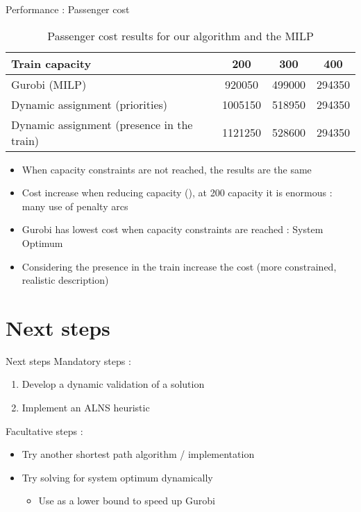 \documentclass{EESD}
\begin{document}
\begin{frame}{Performance : Passenger cost}
	\begin{table}
		\centering
		\begin{tabular}{l|ccc}
			\toprule 
			Train capacity & 200 & 300 & 400 \\
			\midrule
			Gurobi (MILP) & 920050 & 499000 & 294350\\
			Dynamic assignment (priorities) & 1005150 & 518950 & 294350\\
			Dynamic assignment (presence in the train) & 1121250 & 528600 & 294350\\
			\bottomrule
		\end{tabular}
		\caption{Passenger cost results for our algorithm and the MILP}
	\end{table}
	\begin{itemize}
		\item When capacity constraints are not reached, the results are the same 
		\item Cost increase when reducing capacity (), at 200 capacity it is enormous : many use of penalty arcs
		\item Gurobi has lowest cost when capacity constraints are reached : System Optimum
		\item Considering the presence in the train increase the cost (more constrained, realistic description)
	\end{itemize}
\end{frame}


\section{Next steps}
\begin{frame}{Next steps}
	Mandatory steps :
	\begin{enumerate}
		\item Develop a dynamic validation of a solution
		\item Implement an ALNS heuristic
	\end{enumerate}
	Facultative steps :
	\begin{itemize}
		\item Try another shortest path algorithm / implementation
		\item Try solving for system optimum dynamically \begin{itemize}
			\item Use as a lower bound to speed up Gurobi
		\end{itemize}
	\end{itemize}

\end{frame}
\end{document}
